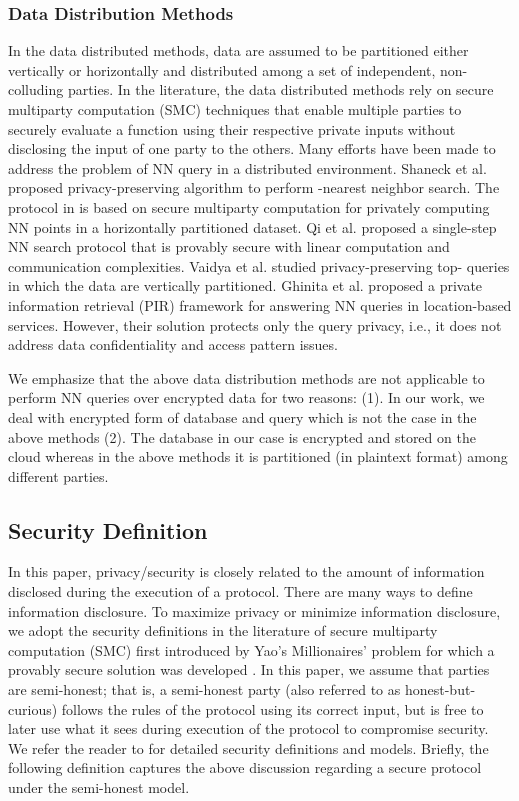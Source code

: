 \documentclass{article}
\begin{document}
\subsubsection{Data Distribution Methods}
In the data distributed methods, data are assumed to be partitioned either 
vertically or horizontally and distributed among a set of independent, 
non-colluding parties. 
In the literature, the data distributed methods 
rely on secure multiparty computation (SMC) techniques 
that enable multiple parties to securely evaluate a function using their respective 
private inputs without disclosing the input of one party to the others. Many 
efforts have been made to address the problem of NN query in a distributed 
environment. Shaneck et al.\cite{shaneck2009privacy} proposed privacy-preserving algorithm to perform  
-nearest neighbor search.
The protocol in\cite{shaneck2009privacy} is based on secure multiparty computation for privately 
computing NN points in a horizontally partitioned dataset. 
Qi et al.\cite{qi2008efficient} proposed a single-step NN search protocol that 
is provably secure with linear computation and communication complexities. 
Vaidya et al.\cite{vaidya2005privacy} studied privacy-preserving top- queries in which the data are vertically partitioned. 
Ghinita et al.\cite{ghinita2008private} proposed a private information retrieval (PIR) framework 
for answering NN queries in location-based services. However, 
their solution protects only the query privacy, i.e., it does not address data confidentiality and access 
pattern issues. 

We emphasize that the above data distribution methods are not 
applicable to perform NN queries over encrypted data for two reasons: (1). 
In our work, we deal with encrypted form of database and query 
which is not the case in the above methods (2). The 
database in our case is encrypted and stored on the cloud 
whereas in the above methods it is partitioned (in plaintext format) 
among different parties.
\subsection{Security Definition}
In this paper, 
privacy/security is closely related to the 
amount of information disclosed during the execution of a protocol. 
There are many ways to define information disclosure. To maximize privacy or 
minimize information disclosure, we adopt the security definitions in the literature 
of secure multiparty computation (SMC) first introduced by Yao's Millionaires' problem
for which a provably secure
solution was developed \cite{Yao82,Yao86}.
In this paper, we assume that parties are
semi-honest; that is,
a semi-honest party (also referred to as honest-but-curious)
follows the rules of the protocol using its correct input,
but is free to later use what it sees during execution of the protocol
to compromise security. We refer the reader to \cite{smc-2004,Goldreichnc} 
for detailed security definitions and models. Briefly, the following 
definition captures the above discussion
regarding a secure protocol under the semi-honest model.
\end{document}
